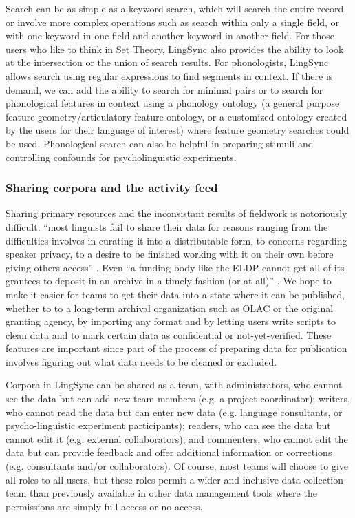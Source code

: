 \documentclass[letterpaper, 12pt, dvips]{mitwpl}
\begin{document}
Search can be as simple as a keyword search,
which will search the entire record,
or involve more complex operations such as search within only a single field,
or with one keyword in one field and another keyword in another field. 
For those users who like to think in Set Theory, LingSync also provides the ability to look at the intersection or the union of search results. 
For phonologists, LingSync allows search using regular expressions to find segments in context.
If there is demand, we can add the ability to search for minimal pairs or to search for phonological features in context using a phonology ontology (a general purpose feature geometry/articulatory feature ontology,
or a customized ontology created by the users for their language of interest)  where feature geometry searches could be used.
Phonological search can also be helpful in %
preparing stimuli and controlling confounds for psycholinguistic experiments.


\subsubsection{Sharing corpora and the
activity feed}
\label{sec:sharingactivityfeeds}

Sharing primary resources and the inconsistant results of fieldwork is notoriously difficult: 
``most linguists fail to share their data for reasons ranging from the difficulties involves in curating it into a distributable form, to concerns regarding speaker privacy, to a desire to be finished working with it on their own before giving others access'' \citep{Bender:2010}. Even ``a funding body like the ELDP cannot get all of its grantees to deposit in an archive in a timely fashion (or at all)'' \citep{Thieberger:2012}. We hope to make it easier for teams to get their data into a state where it can be published, whether to to a long-term archival organization such as OLAC or the original granting agency, by importing any format and by letting users write scripts to clean data and to mark certain data as confidential or not-yet-verified. These features are important since part of the process of preparing data for publication involves figuring out what data needs to be cleaned or excluded.


Corpora in LingSync can be shared as a team,
with administrators,
who cannot see the data
but can add new team members (e.g.
a project coordinator); writers,
who cannot read the data but can enter new data (e.g.
language consultants,
or psycho-linguistic experiment participants); readers,
who can see the data but cannot edit it (e.g.
external collaborators); and commenters,
 who cannot edit the data but can provide feedback and offer additional information or corrections (e.g.
consultants and/or collaborators).
 Of course,
most teams will choose to give all roles to all users,
but these roles permit a wider and inclusive data collection team than previously available  in other data management tools where the permissions are simply full access or no access.
\end{document}
